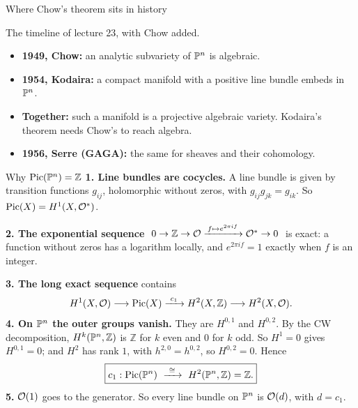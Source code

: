 \begin{frame}{Where Chow's theorem sits in history}
\label{fr:chow-timeline}
\begin{center}
\end{center}
\par\bigskip
The timeline of lecture 23, with Chow added.
\par\medskip
\begin{itemize}
\setlength{\itemsep}{6pt}
\item \textbf{1949, Chow:} an analytic subvariety of \(\mathbb P^n\) is algebraic.
\item \textbf{1954, Kodaira:} a compact manifold with a positive line bundle embeds in \(\mathbb P^n\).
\item \textbf{Together:} such a manifold is a projective algebraic variety. Kodaira's theorem needs Chow's to reach algebra.
\item \textbf{1956, Serre (GAGA):} the same for sheaves and their cohomology.
\end{itemize}
\end{frame}

\begin{frame}{Why \(\operatorname{Pic}(\mathbb P^n)=\mathbb Z\)}
\label{fr:prov-od-0}
\textbf{1. Line bundles are cocycles.} A line bundle is given by transition functions \(g_{ij}\), holomorphic without zeros, with \(g_{ij}g_{jk}=g_{ik}\). So \(\operatorname{Pic}(X)=H^1(X,\mathcal O^*)\).
\par\smallskip
\textbf{2. The exponential sequence} \(\ 0\to\mathbb Z\to\mathcal O\xrightarrow{\,f\mapsto e^{2\pi if}\,}\mathcal O^*\to0\ \) is exact: a function without zeros has a logarithm locally, and \(e^{2\pi if}=1\) exactly when \(f\) is an integer.
\par\smallskip
\textbf{3. The long exact sequence} contains
\[
H^1(X,\cO)\longrightarrow\operatorname{Pic}(X)\xrightarrow{\ c_1\ }H^2(X,\mathbb Z)\longrightarrow H^2(X,\cO).
\]
\textbf{4. On \(\mathbb P^n\) the outer groups vanish.} They are \(H^{0,1}\) and \(H^{0,2}\). By the CW decomposition, \(H^k(\mathbb P^n,\mathbb Z)\) is \(\mathbb Z\) for \(k\) even and \(0\) for \(k\) odd. So \(H^1=0\) gives \(H^{0,1}=0\); and \(H^2\) has rank \(1\), with \(h^{2,0}=h^{0,2}\), so \(H^{0,2}=0\). Hence
\[
\boxed{c_1:\operatorname{Pic}(\Pj^n)\ \xrightarrow{\ \cong\ }\ H^2(\Pj^n,\mathbb Z)=\mathbb Z .}
\]
\textbf{5.} \(\mathcal O(1)\) goes to the generator. So every line bundle on \(\mathbb P^n\) is \(\mathcal O(d)\), with \(d=c_1\).
\end{frame}


